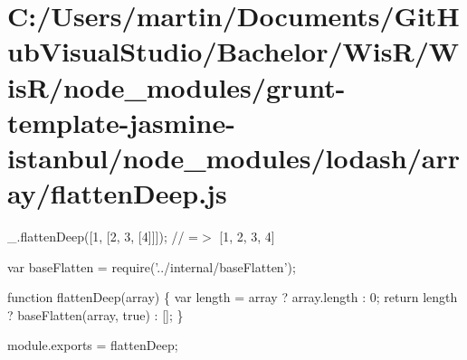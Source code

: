 \hypertarget{_c_1_2_users_2martin_2_documents_2_git_hub_visual_studio_2_bachelor_2_wis_r_2_wis_r_2node_module5fb450a84e30de3f3a34cb5f2ed70695}{}\section{C\+:/\+Users/martin/\+Documents/\+Git\+Hub\+Visual\+Studio/\+Bachelor/\+Wis\+R/\+Wis\+R/node\+\_\+modules/grunt-\/template-\/jasmine-\/istanbul/node\+\_\+modules/lodash/array/flatten\+Deep.\+js}
\+\_\+.\+flatten\+Deep(\mbox{[}1, \mbox{[}2, 3, \mbox{[}4\mbox{]}\mbox{]}\mbox{]}); // =$>$ \mbox{[}1, 2, 3, 4\mbox{]}


\begin{DoxyCodeInclude}
var baseFlatten = require(\textcolor{stringliteral}{'../internal/baseFlatten'});

\textcolor{keyword}{function} flattenDeep(array) \{
  var length = array ? array.length : 0;
  \textcolor{keywordflow}{return} length ? baseFlatten(array, \textcolor{keyword}{true}) : [];
\}

module.exports = flattenDeep;
\end{DoxyCodeInclude}
 